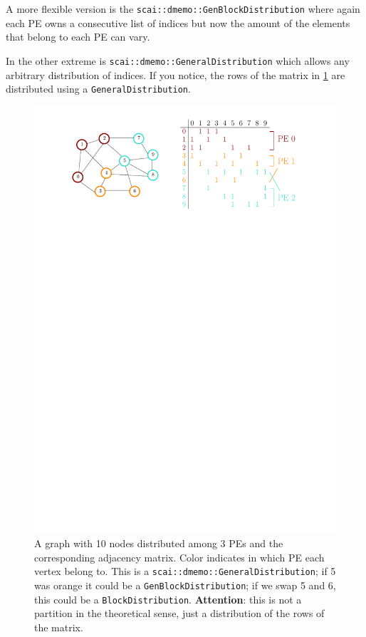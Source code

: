 \documentclass[a4paper,10pt]{article}
\newcommand{\att}{\textbf{Attention}: }
\newcommand{\MI}[1]{\texttt{#1}}
\begin{document}
A more flexible version is the \MI{scai::dmemo::GenBlockDistribution} where again each PE owns a 
consecutive list of indices but now the amount of the elements that belong to each PE can vary.

In the other extreme is \MI{scai::dmemo::GeneralDistribution} which allows any 
arbitrary distribution of indices. 
If you notice, the rows of the matrix in \cref{fig:graph} are distributed using a
\MI{GeneralDistribution}. 

\begin{figure}[h]
\centering
\includegraphics[scale=0.8]{graph}
\caption{A graph with 10 nodes distributed among 3 PEs and the corresponding adjacency 
matrix. Color indicates in which PE each vertex belong to. This is a \MI{scai::dmemo::GeneralDistribution}; if 5 was orange it could be a
\MI{GenBlockDistribution}; if we swap 5 and 6, this could be a \MI{BlockDistribution}.
\att this is not a partition in the theoretical sense, just a distribution of
the rows of the matrix.}
\label{fig:graph}
\end{figure}
\end{document}

